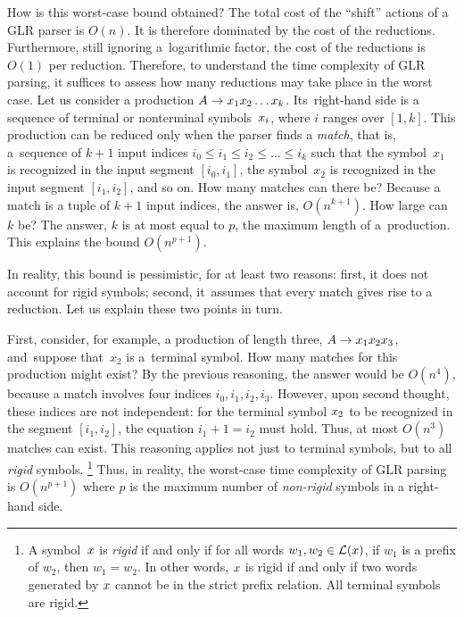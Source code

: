 How is this worst-case bound obtained?
%
The total cost of the ``shift'' actions of a GLR parser is $O(n)$.
It is therefore dominated by the cost of the reductions.
%
Furthermore,
still ignoring a~logarithmic factor,
the cost of the reductions is $O(1)$ per reduction.
%
Therefore,
to understand the time complexity of GLR parsing,
it suffices to assess how many reductions
may take place
in the worst case.
%
Let us consider a production $A \rightarrow x_1x_2\ldots x_k$.
Its~right-hand side is a sequence of terminal or nonterminal symbols~$x_i$,
where $i$ ranges over $[1, k]$.
%
This production can be reduced
only when the parser finds a \emph{match},
that is,
a~sequence of $k+1$ input indices $i_0 \leq i_1 \leq i_2 \leq \ldots \leq i_k$
such that
the symbol~$x_1$ is recognized in the input segment $[i_0, i_1]$,
the symbol~$x_2$ is recognized in the input segment $[i_1, i_2]$,
and so on.
%
%
How many matches can there be?
%
Because a match is a tuple of $k+1$ input indices,
the answer is, $O(n^{k+1})$.
%
How large can $k$ be?
%
The answer, $k$ is at most equal to $p$,
the maximum length of a~production.
%
This explains the bound $O(n^{p+1})$.

In reality, this bound is pessimistic, for at least two reasons:
first, it does not account for rigid symbols;
second,
it~assumes that every match gives rise to a reduction.
Let us explain these two points in turn.

First,
consider, for example,
a production of length three,
$A \rightarrow x_1x_2x_3$,
and~suppose that~$x_2$ is a~terminal symbol.
How many matches for this production might exist?
By the previous reasoning,
the answer would be $O(n^4)$,
because a match involves four indices $i_0, i_1, i_2, i_3$.
However, upon second thought, these indices are not independent:
for the terminal symbol $x_2$ to be recognized in the segment $[i_1, i_2]$,
the equation $i_1 + 1 = i_2$ must hold.
Thus, at most $O(n^3)$ matches can exist.
This reasoning applies not just to terminal symbols,
but to all \emph{rigid} symbols.%
\footnote{A symbol~$x$ is \emph{rigid} if and only if
for all words $w_1, w_2 \in \mathcal{L}(x)$,
if $w_1$ is a prefix of $w_2$,
then $w_1=w_2$.
In other words, $x$ is rigid if and only if
two words generated by $x$ cannot be in the
strict prefix relation.
All terminal symbols are rigid.}
%
Thus, in reality,
the worst-case time complexity of GLR parsing is
$O(n^{p+1})$ where $p$ is the maximum number of \emph{non-rigid}
symbols in a right-hand side.

